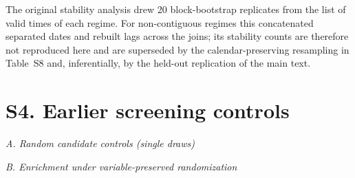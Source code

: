 \documentclass[11pt]{article}
\begin{document}
\noindent The original stability analysis drew 20 block-bootstrap replicates from the list of valid times of each regime. For non-contiguous regimes this concatenated separated dates and rebuilt lags across the joins; its stability counts are therefore not reproduced here and are superseded by the calendar-preserving resampling in Table~S8 and, inferentially, by the held-out replication of the main text.

\section*{S4. Earlier screening controls}

\begin{table}[htbp]
\centering
\caption{Graph null models, enrichment and directional falsification for the full-record screen.}
\label{tab:s9}
\scriptsize
\par\smallskip\noindent\textit{A. Random candidate controls (single draws)}\par\smallskip
{}
\par\smallskip\noindent\textit{B. Enrichment under variable-preserved randomization}\par\smallskip
{}
\end{table}
\end{document}
